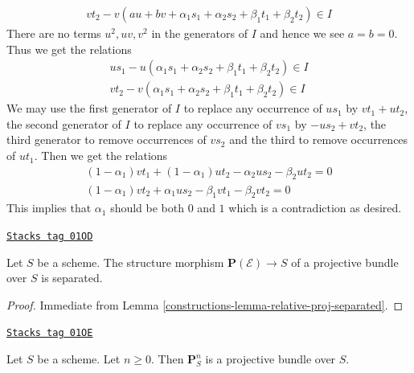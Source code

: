 \begin{example}
$$\begin{matrix}
vt_2 - v(au + bv + \alpha_1s_1 + \alpha_2s_2 + \beta_1t_1 + \beta_2t_2)
\in I
\end{matrix}
$$
There are no terms $u^2, uv, v^2$ in the generators of $I$ and
hence we see $a = b = 0$. Thus we get the relations
$$
\begin{matrix}
us_1 - u(\alpha_1s_1 + \alpha_2s_2 + \beta_1t_1 + \beta_2t_2)
\in I \\
vt_2 - v(\alpha_1s_1 + \alpha_2s_2 + \beta_1t_1 + \beta_2t_2)
\in I
\end{matrix}
$$
We may use the first generator of $I$ to replace any occurrence of
$us_1$ by $vt_1 + ut_2$, the second generator of $I$ to replace any
occurrence of $vs_1$ by $-us_2 + vt_2$, the third generator
to remove occurrences of $vs_2$ and the third to remove occurrences
of $ut_1$. Then we get the relations
$$
\begin{matrix}
(1 - \alpha_1)vt_1 + (1 - \alpha_1)ut_2 - \alpha_2us_2 - \beta_2ut_2 = 0 \\
(1 - \alpha_1)vt_2 + \alpha_1us_2 - \beta_1vt_1 - \beta_2vt_2 = 0
\end{matrix}
$$
This implies that $\alpha_1$ should be both $0$ and $1$ which is
a contradiction as desired.
\end{example}


\begin{lemma}
\label{constructions-lemma-projective-bundle-separated}
\href{https://stacks.math.columbia.edu/tag/01OD}{\texttt{Stacks tag 01OD}}

Let $S$ be a scheme.
The structure morphism $\mathbf{P}(\mathcal{E}) \to S$ of a
projective bundle over $S$ is separated.
\end{lemma}

\begin{proof}

Immediate from Lemma \ref{constructions-lemma-relative-proj-separated}.
\end{proof}

\begin{lemma}
\label{constructions-lemma-projective-space-bundle}
\href{https://stacks.math.columbia.edu/tag/01OE}{\texttt{Stacks tag 01OE}}

Let $S$ be a scheme. Let $n \geq 0$. Then
$\mathbf{P}^n_S$ is a projective bundle over $S$.
\end{lemma}

